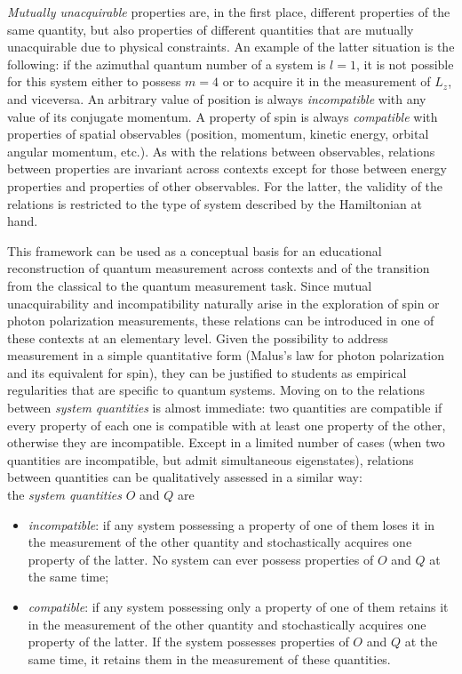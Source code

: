 \documentclass[twocolumn,secnumarabic,amssymb, nobibnotes, aps, prd, nofootinbib]{revtex4-2}
\begin{document}
\emph{Mutually unacquirable} properties are, in the first place, different properties of the same quantity, but also properties of different quantities that are mutually unacquirable due to physical constraints. An example of the latter situation is the following: if the azimuthal quantum number of a system is $l=1$, it is not possible for this system either to possess $m=4$ or to acquire it in the measurement of $L_z$, and viceversa. An arbitrary value of position is always \emph{incompatible} with any value of its conjugate momentum. A property of spin is always \emph{compatible} with properties of spatial observables (position, momentum, kinetic energy, orbital angular momentum, etc.). As with the relations between observables, relations between properties are invariant across contexts except for those between energy properties and properties of other observables. For the latter, the validity of the relations is restricted to the type of system described by the Hamiltonian at hand.

This framework can be used as a conceptual basis for an educational reconstruction of quantum measurement across contexts and of the transition from the classical to the quantum measurement task. Since mutual unacquirability and incompatibility naturally arise in the exploration of spin or photon polarization measurements, these relations can be introduced in one of these contexts at an elementary level. Given the possibility to address measurement in a simple quantitative form (Malus's law for photon polarization and its equivalent for spin), they can be justified to students as empirical regularities that are specific to quantum systems. Moving on to the relations between \emph{system quantities} is almost immediate: two quantities are compatible if every property of each one is compatible with at least one property of the other, otherwise they are incompatible. Except in a limited number of cases (when two quantities are incompatible, but admit simultaneous eigenstates), relations between quantities can be qualitatively assessed in a similar way:\\
the \textit{system quantities} $O$ and $Q$ are
\begin{itemize}
        \item \emph{incompatible}: if any system possessing a property of one of them loses it in the measurement of the other quantity and stochastically acquires one property of the latter. No system can ever possess properties of $O$ and $Q$ at the same time;
        \item \emph{compatible}: if any system possessing only a property of one of them retains it in the measurement of the other quantity and stochastically acquires one property of the latter. If the system possesses properties of $O$ and $Q$ at the same time, it retains them in the measurement of these quantities.
\end{itemize}
\end{document}

